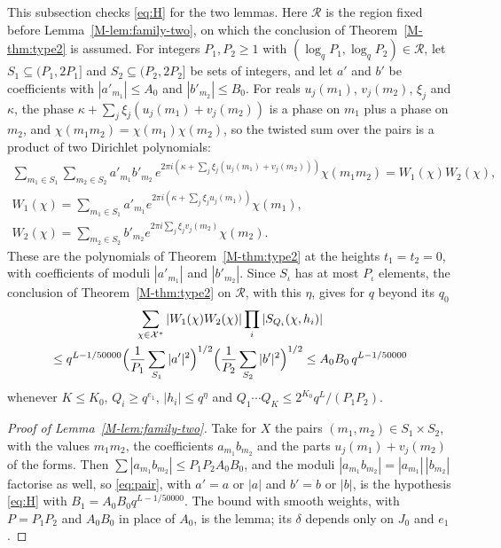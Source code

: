 \documentclass[11pt]{article}
\numberwithin{equation}{section}
\begin{document}
This subsection checks \eqref{eq:H} for the two lemmas. Here $\mathcal R$ is the region fixed before
Lemma~\ref{M-lem:family-two}, on which the conclusion of Theorem~\ref{M-thm:type2} is assumed. For integers $P_1, P_2
\ge 1$ with $(\log_q P_1, \log_q P_2) \in \mathcal R$, let $S_1 \subseteq (P_1, 2P_1]$ and $S_2 \subseteq (P_2, 2P_2]$
be sets of integers, and let $a'$ and $b'$ be coefficients with $|a'_{m_1}| \le A_0$ and $|b'_{m_2}| \le B_0$. For reals
$u_j(m_1)$, $v_j(m_2)$, $\xi_j$ and $\kappa$, the phase $\kappa + \sum_j \xi_j(u_j(m_1) + v_j(m_2))$ is
a phase on $m_1$ plus a phase on $m_2$, and $\chi(m_1 m_2) = \chi(m_1) \chi(m_2)$, so the twisted sum over the pairs is
a product of two Dirichlet polynomials:
\begin{gather*}
  \sum_{m_1 \in S_1} \sum_{m_2 \in S_2} a'_{m_1} b'_{m_2} \, e^{2\pi i(\kappa + \sum_j \xi_j(u_j(m_1) +
  v_j(m_2)))} \chi(m_1 m_2) = W_1(\chi) W_2(\chi), \\
  W_1(\chi) = \sum_{m_1 \in S_1} a'_{m_1} e^{2\pi i(\kappa + \sum_j \xi_j u_j(m_1))} \chi(m_1), \\
  W_2(\chi) = \sum_{m_2 \in S_2} b'_{m_2} e^{2\pi i \sum_j \xi_j v_j(m_2)} \chi(m_2).
\end{gather*}
These are the polynomials of Theorem~\ref{M-thm:type2} at the heights $t_1 = t_2 = 0$, with coefficients of moduli
$|a'_{m_1}|$ and $|b'_{m_2}|$. Since $S_\iota$ has at most $P_\iota$ elements, the conclusion of
Theorem~\ref{M-thm:type2} on $\mathcal R$, with this $\eta$, gives for $q$ beyond its $q_0$
\begin{multline}\label{eq:pair}
  \sum_{\chi \in \mathcal X^*} |W_1(\chi) W_2(\chi)| \prod_i |S_{Q_i}(\chi, h_i)| \\
  \le q^{L - 1/50000} \Bigl(\frac1{P_1} \sum_{S_1} |a'|^2\Bigr)^{1/2} \Bigl(\frac1{P_2} \sum_{S_2} |b'|^2\Bigr)^{1/2}
  \le A_0 B_0 \, q^{L - 1/50000}
\end{multline}
whenever $K \le K_0$, $Q_i \ge q^{e_1}$, $|h_i| \le q^\eta$ and $Q_1 \cdots Q_K \le 2^{K_0} q^L/(P_1 P_2)$.

\begin{proof}[Proof of Lemma~\ref{M-lem:family-two}]
Take for $X$ the pairs $(m_1, m_2) \in S_1 \times S_2$, with the values $m_1 m_2$, the coefficients $a_{m_1} b_{m_2}$
and the parts $u_j(m_1) + v_j(m_2)$ of the forms. Then $\sum |a_{m_1} b_{m_2}| \le P_1 P_2 A_0 B_0$, and the
moduli $|a_{m_1} b_{m_2}| = |a_{m_1}| \, |b_{m_2}|$ factorise as well, so \eqref{eq:pair}, with $a' = a$ or $|a|$ and
$b' = b$ or $|b|$, is the hypothesis \eqref{eq:H} with $B_1 = A_0 B_0 q^{L - 1/50000}$. The bound with smooth weights,
with $P = P_1 P_2$ and $A_0 B_0$ in place of $A_0$, is the lemma; its $\delta$ depends only on $J_0$ and $e_1$.
\end{proof}
\end{document}
